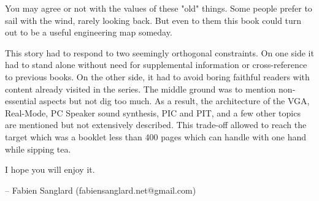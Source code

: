 You may agree or not with the values of these "old" things. Some people prefer to sail with the wind, rarely looking back. But even to them this book could turn out to be a useful engineering map someday.\\
\par
 This story had to respond to two seemingly orthogonal constraints. On one side it had to stand alone without need for supplemental information or cross-reference to previous books. On the other side, it had to avoid boring faithful readers with content already visited in the series. The middle ground was to mention non-essential aspects but not dig too much. As a result, the architecture of the VGA, Real-Mode, PC Speaker sound synthesis, PIC and PIT, and a few other topics are mentioned but not extensively described. This trade-off allowed to reach the target which was a booklet less than 400 pages which can handle with one hand while sipping tea.\\
\par
I hope you will enjoy it.\\
\par
-- Fabien Sanglard (fabiensanglard.net@gmail.com)
